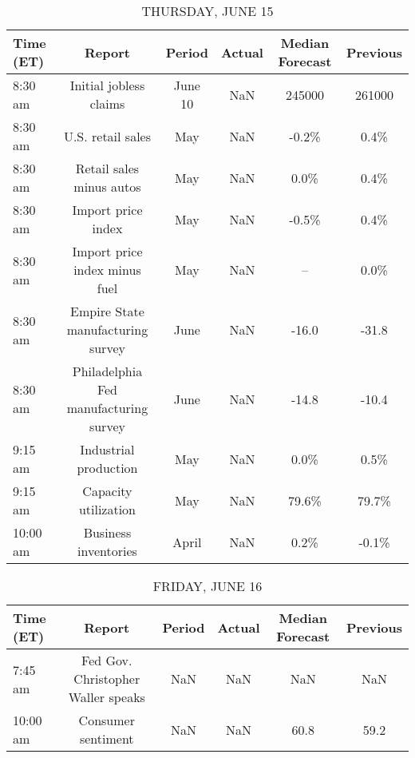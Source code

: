 \documentclass{article}%
\begin{document}
\begin{table}[htbp]%
\caption{THURSDAY, JUNE 15}%
\centering%
\begin{adjustbox}{width=1\textwidth}%
\begin{tabular}{lccccc}
\toprule
Time (ET) &                                Report &  Period & Actual & Median Forecast & Previous \\
\midrule
  8:30 am &                Initial jobless claims & June 10 &    NaN &          245000 &   261000 \\
  8:30 am &                     U.S. retail sales &     May &    NaN &           -0.2\% &     0.4\% \\
  8:30 am &              Retail sales minus autos &     May &    NaN &            0.0\% &     0.4\% \\
  8:30 am &                    Import price index &     May &    NaN &           -0.5\% &     0.4\% \\
  8:30 am &         Import price index minus fuel &     May &    NaN &              -- &     0.0\% \\
  8:30 am &     Empire State manufacturing survey &    June &    NaN &           -16.0 &    -31.8 \\
  8:30 am & Philadelphia Fed manufacturing survey &    June &    NaN &           -14.8 &    -10.4 \\
  9:15 am &                 Industrial production &     May &    NaN &            0.0\% &     0.5\% \\
  9:15 am &                  Capacity utilization &     May &    NaN &           79.6\% &    79.7\% \\
 10:00 am &                  Business inventories &   April &    NaN &            0.2\% &    -0.1\% \\
\bottomrule
\end{tabular}
%
\end{adjustbox}%
\end{table}

%


\begin{table}[htbp]%
\caption{FRIDAY, JUNE 16}%
\centering%
\begin{adjustbox}{width=1\textwidth}%
\begin{tabular}{lccccc}
\toprule
Time (ET) &                             Report & Period & Actual & Median Forecast & Previous \\
\midrule
  7:45 am & Fed Gov. Christopher Waller speaks &    NaN &    NaN &             NaN &      NaN \\
 10:00 am &                 Consumer sentiment &    NaN &    NaN &            60.8 &     59.2 \\
\bottomrule
\end{tabular}
%
\end{adjustbox}%
\end{table}
\end{document}
